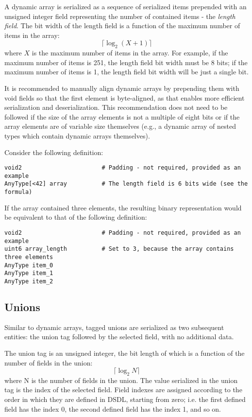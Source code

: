 A dynamic array is serialized as a sequence of serialized items prepended with an unsigned
integer field representing the number of contained items - the \emph{length field}.
The bit width of the length field is a function of the maximum number of items in the array:
$$\lceil{}\log_2 (X + 1)\rceil{}$$
where $X$ is the maximum number of items in the array.
For example, if the maximum number of items is 251, the length field bit width must be 8 bits;
if the maximum number of items is 1, the length field bit width will be just a single bit.

It is recommended to manually align dynamic arrays by prepending them with void fields
so that the first element is byte-aligned, as that enables more efficient serialization and
deserialization.
This recommendation does not need to be followed if the size of the array elements is not
a multiple of eight bits or if the array elements are of variable size themselves
(e.g., a dynamic array of nested types which contain dynamic arrays themselves).

Consider the following definition:

\begin{verbatim}
void2                       # Padding - not required, provided as an example
AnyType[<42] array          # The length field is 6 bits wide (see the formula)
\end{verbatim}

If the array contained three elements,
the resulting binary representation would be equivalent to that of the following definition:

\begin{verbatim}
void2                       # Padding - not required, provided as an example
uint6 array_length          # Set to 3, because the array contains three elements
AnyType item_0
AnyType item_1
AnyType item_2
\end{verbatim}

\subsection{Unions}

Similar to dynamic arrays, tagged unions are serialized as two subsequent entities:
the union tag followed by the selected field, with no additional data.

The union tag is an unsigned integer, the bit length of which is a function of the number of fields in the union:
$$\lceil{}\log_2 N\rceil{}$$
where N is the number of fields in the union.
The value serialized in the union tag is the index of the selected field.
Field indexes are assigned according to the order in which they are defined in DSDL,
starting from zero;
i.e. the first defined field has the index 0, the second defined field has the index 1, and so on.

